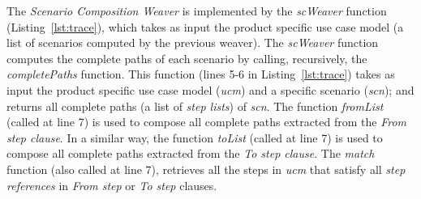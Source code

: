 

The \emph{Scenario Composition Weaver} is implemented by the \emph{scWeaver} function (Listing~\ref{lst:trace}), which takes
as input the product specific use case model (a list of scenarios computed by the previous weaver).
The \emph{scWeaver} function computes the complete paths of each
scenario by calling, recursively, the \emph{completePaths} function. This
function (lines 5-6 in Listing~\ref{lst:trace})
takes as input the product specific use case model (\emph{ucm}) and a specific
scenario (\emph{scn});
and returns all complete paths (a list of \emph{step lists}) of
\emph{scn}. The function \emph{fromList} (called at line 7) is used to
compose all complete paths extracted from the \emph{From step
clause}. In a similar way, the function \emph{toList} (called at
line 7) is used to compose all complete paths extracted from the
\emph{To step clause}. The \emph{match} function (also called at
line 7), retrieves all the steps in \emph{ucm} that satisfy all
\emph{step references} in \emph{From step} or \emph{To step}
clauses.


%
%

